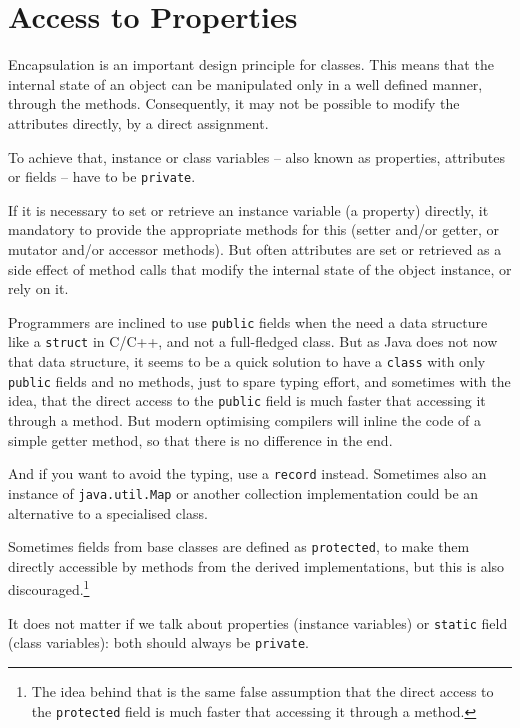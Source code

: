 \documentclass[11pt,a4paper, titlepage, parskip=half, headsepline, footsepline, cleardoublepage=current, headheight=1cm]{scrbook}
\begin{document}
\section{Access to Properties}
Encapsulation is an important design principle for classes. This means that the internal state of an object can be manipulated only in a well defined manner, through the methods. Consequently, it may not be possible to modify the attributes  directly, by a direct assignment.

To achieve that, instance or class variables – also known as properties, attributes or fields – have to be \lstinline|private|.

If it is necessary to set or retrieve an instance variable (a property) directly, it mandatory to provide the appropriate methods for this (setter and/or getter, or mutator and/or accessor methods). But often attributes are set or retrieved as a side effect of method calls that modify the internal state of the object instance, or rely on it.

Programmers are inclined to use \lstinline|public| fields when the need a data structure like a \lstinline|struct| in C/C++, and not a full-fledged class. But as Java does not now that data structure, it seems to be a quick solution to have a \lstinline|class| with only \lstinline|public| fields and no methods, just to spare typing effort, and sometimes with the idea, that the direct access to the \lstinline|public| field is much faster that accessing it through a method. But modern optimising compilers will inline the code of a simple getter method, so that there is no difference in the end.

And if you want to avoid the typing, use a \lstinline|record|\autocite{ORACLE_DOC_RECORD,ORACLE_DOC_LANGUAGE_SPECIFICATION:RecordClasses} instead. Sometimes also an instance of \lstinline|java.util.Map| or another collection implementation could be an alternative to a specialised class.
 
Sometimes fields from base classes are defined as \lstinline|protected|, to make them directly accessible by methods from the derived implementations, but this is also discouraged.\footnote{The idea behind that is the same false assumption that the direct access to the \lstinline|protected| field is much faster that accessing it through a method.}

It does not matter if we talk about properties (instance variables) or \lstinline|static| field (class variables): both should always be \lstinline|private|.
\end{document}
